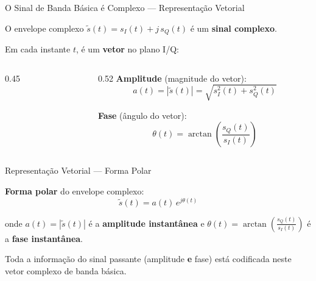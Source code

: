 \begin{frame}{O Sinal de Banda Básica é Complexo — Representação Vetorial}

O envelope complexo $\tilde{s}(t) = s_I(t) + j\,s_Q(t)$ é um \textbf{sinal complexo}.

Em cada instante $t$, é um \textbf{vetor} no plano I/Q:

\begin{columns}[c]
\begin{column}{0.45\textwidth}
\begin{center}
\end{center}
\end{column}
\begin{column}{0.52\textwidth}
\textbf{Amplitude} (magnitude do vetor):
\[
a(t) = |\tilde{s}(t)| = \sqrt{s_I^2(t) + s_Q^2(t)}
\]

\textbf{Fase} (ângulo do vetor):
\[
\theta(t) = \arctan\!\left(\frac{s_Q(t)}{s_I(t)}\right)
\]
\end{column}
\end{columns}

\end{frame}


\begin{frame}{Representação Vetorial — Forma Polar}

\textbf{Forma polar} do envelope complexo:
\[
\boxed{\tilde{s}(t) = a(t)\,e^{j\theta(t)}}
\]

onde $a(t) = |\tilde{s}(t)|$ é a \textbf{amplitude instantânea} e $\theta(t) = \arctan\!\left(\frac{s_Q(t)}{s_I(t)}\right)$ é a \textbf{fase instantânea}.

\vspace{0.3cm}

Toda a informação do sinal passante (amplitude \textbf{e} fase) está codificada neste vetor complexo de banda básica.

\end{frame}

